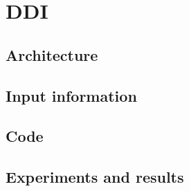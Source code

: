 
\section{DDI}%
\label{sec:ddi}

\subsection{Architecture}%
\label{sub:ddi-arch}

\subsection{Input information}%
\label{sub:ddi-input}

\subsection{Code}%
\label{sub:ddi-code}

\subsection{Experiments and results}%
\label{sub:ddi-experiments}
